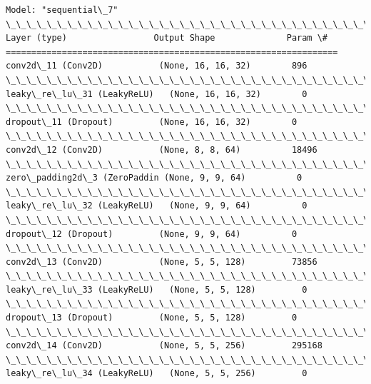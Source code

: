 \documentclass[11pt]{article}
\begin{document}
    \begin{Verbatim}[commandchars=\\\{\}]
Model: "sequential\_7"
\_\_\_\_\_\_\_\_\_\_\_\_\_\_\_\_\_\_\_\_\_\_\_\_\_\_\_\_\_\_\_\_\_\_\_\_\_\_\_\_\_\_\_\_\_\_\_\_\_\_\_\_\_\_\_\_\_\_\_\_\_\_\_\_\_
Layer (type)                 Output Shape              Param \#   
=================================================================
conv2d\_11 (Conv2D)           (None, 16, 16, 32)        896       
\_\_\_\_\_\_\_\_\_\_\_\_\_\_\_\_\_\_\_\_\_\_\_\_\_\_\_\_\_\_\_\_\_\_\_\_\_\_\_\_\_\_\_\_\_\_\_\_\_\_\_\_\_\_\_\_\_\_\_\_\_\_\_\_\_
leaky\_re\_lu\_31 (LeakyReLU)   (None, 16, 16, 32)        0         
\_\_\_\_\_\_\_\_\_\_\_\_\_\_\_\_\_\_\_\_\_\_\_\_\_\_\_\_\_\_\_\_\_\_\_\_\_\_\_\_\_\_\_\_\_\_\_\_\_\_\_\_\_\_\_\_\_\_\_\_\_\_\_\_\_
dropout\_11 (Dropout)         (None, 16, 16, 32)        0         
\_\_\_\_\_\_\_\_\_\_\_\_\_\_\_\_\_\_\_\_\_\_\_\_\_\_\_\_\_\_\_\_\_\_\_\_\_\_\_\_\_\_\_\_\_\_\_\_\_\_\_\_\_\_\_\_\_\_\_\_\_\_\_\_\_
conv2d\_12 (Conv2D)           (None, 8, 8, 64)          18496     
\_\_\_\_\_\_\_\_\_\_\_\_\_\_\_\_\_\_\_\_\_\_\_\_\_\_\_\_\_\_\_\_\_\_\_\_\_\_\_\_\_\_\_\_\_\_\_\_\_\_\_\_\_\_\_\_\_\_\_\_\_\_\_\_\_
zero\_padding2d\_3 (ZeroPaddin (None, 9, 9, 64)          0         
\_\_\_\_\_\_\_\_\_\_\_\_\_\_\_\_\_\_\_\_\_\_\_\_\_\_\_\_\_\_\_\_\_\_\_\_\_\_\_\_\_\_\_\_\_\_\_\_\_\_\_\_\_\_\_\_\_\_\_\_\_\_\_\_\_
leaky\_re\_lu\_32 (LeakyReLU)   (None, 9, 9, 64)          0         
\_\_\_\_\_\_\_\_\_\_\_\_\_\_\_\_\_\_\_\_\_\_\_\_\_\_\_\_\_\_\_\_\_\_\_\_\_\_\_\_\_\_\_\_\_\_\_\_\_\_\_\_\_\_\_\_\_\_\_\_\_\_\_\_\_
dropout\_12 (Dropout)         (None, 9, 9, 64)          0         
\_\_\_\_\_\_\_\_\_\_\_\_\_\_\_\_\_\_\_\_\_\_\_\_\_\_\_\_\_\_\_\_\_\_\_\_\_\_\_\_\_\_\_\_\_\_\_\_\_\_\_\_\_\_\_\_\_\_\_\_\_\_\_\_\_
conv2d\_13 (Conv2D)           (None, 5, 5, 128)         73856     
\_\_\_\_\_\_\_\_\_\_\_\_\_\_\_\_\_\_\_\_\_\_\_\_\_\_\_\_\_\_\_\_\_\_\_\_\_\_\_\_\_\_\_\_\_\_\_\_\_\_\_\_\_\_\_\_\_\_\_\_\_\_\_\_\_
leaky\_re\_lu\_33 (LeakyReLU)   (None, 5, 5, 128)         0         
\_\_\_\_\_\_\_\_\_\_\_\_\_\_\_\_\_\_\_\_\_\_\_\_\_\_\_\_\_\_\_\_\_\_\_\_\_\_\_\_\_\_\_\_\_\_\_\_\_\_\_\_\_\_\_\_\_\_\_\_\_\_\_\_\_
dropout\_13 (Dropout)         (None, 5, 5, 128)         0         
\_\_\_\_\_\_\_\_\_\_\_\_\_\_\_\_\_\_\_\_\_\_\_\_\_\_\_\_\_\_\_\_\_\_\_\_\_\_\_\_\_\_\_\_\_\_\_\_\_\_\_\_\_\_\_\_\_\_\_\_\_\_\_\_\_
conv2d\_14 (Conv2D)           (None, 5, 5, 256)         295168    
\_\_\_\_\_\_\_\_\_\_\_\_\_\_\_\_\_\_\_\_\_\_\_\_\_\_\_\_\_\_\_\_\_\_\_\_\_\_\_\_\_\_\_\_\_\_\_\_\_\_\_\_\_\_\_\_\_\_\_\_\_\_\_\_\_
leaky\_re\_lu\_34 (LeakyReLU)   (None, 5, 5, 256)         0         

\end{Verbatim}
\end{document}
